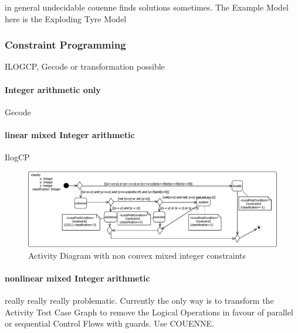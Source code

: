 in general undecidable couenne finds solutions sometimes.
The Example Model here is the Exploding Tyre Model
\subsubsection{Constraint Programming}
ILOGCP, Gecode or transformation possible
\paragraph{Integer arithmetic only} Gecode
\paragraph{linear mixed Integer arithmetic} IlogCP
\begin{figure}
\label{fig:classifyTriangle}
\includegraphics[width=\textwidth]{./pics/TriangleClassificator.pdf}
\caption{Activity Diagram with non convex mixed integer constraints}
\end{figure}
\paragraph{nonlinear mixed Integer arithmetic}
really really really problematic. Currently the only way is to transform the Activity Test Case Graph to remove the Logical Operations in favour of parallel or sequential Control Flows with guards. Use COUENNE.
